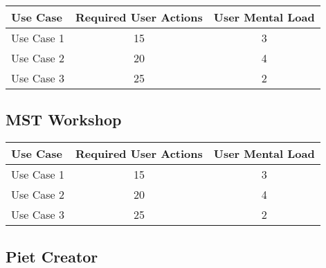 \begin{tabular*}{\textwidth}{lcc}
\textbf{Use Case} & \textbf{Required User Actions} & \textbf{User Mental Load}\\
\hline
Use Case 1                          & 15 & 3 \\
Use Case 2                          & 20 & 4 \\
Use Case 3                          & 25 & 2
\end{tabular*}

\subsection{MST Workshop}




\begin{tabular*}{\textwidth}{lcc}
\textbf{Use Case} & \textbf{Required User Actions} & \textbf{User Mental Load}\\
\hline
Use Case 1                          & 15 & 3 \\
Use Case 2                          & 20 & 4 \\
Use Case 3                          & 25 & 2
\end{tabular*}

\subsection{Piet Creator}


